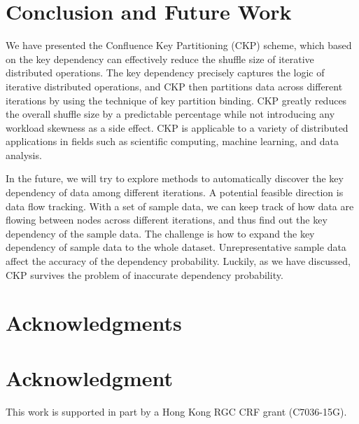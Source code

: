 \documentclass[10pt,journal,compsoc]{IEEEtran}
\begin{document}
\section{Conclusion and Future Work}\label{section:conclusion}
We have presented the Confluence Key Partitioning (CKP) scheme,
which based on the key dependency
can effectively reduce the shuffle size of
iterative distributed operations.
The key dependency precisely captures the logic of iterative distributed
operations, and CKP then partitions data across different iterations by using
the technique of key partition binding.
CKP greatly reduces the overall shuffle size by a predictable percentage 
while not introducing any workload skewness as a side effect. CKP is
applicable to a variety of distributed applications
in fields such as scientific computing, machine learning, and data
analysis.

In the future, we will try to explore methods to automatically discover
the key dependency of data among different iterations.
A potential feasible direction is data flow tracking. 
With a set of sample data, we can keep track of how data are flowing
between nodes across different iterations, and thus find out the key
dependency of the sample data.
The challenge is how to expand the key dependency of sample data to the
whole dataset.
Unrepresentative sample data affect the accuracy of the dependency probability. 
Luckily, as we have discussed, CKP survives the problem of inaccurate
dependency probability.


\ifCLASSOPTIONcompsoc
 \section*{Acknowledgments}
\else
 \section*{Acknowledgment}
\fi
This work is supported in part by a Hong Kong RGC CRF grant
(C7036-15G).
\end{document}
